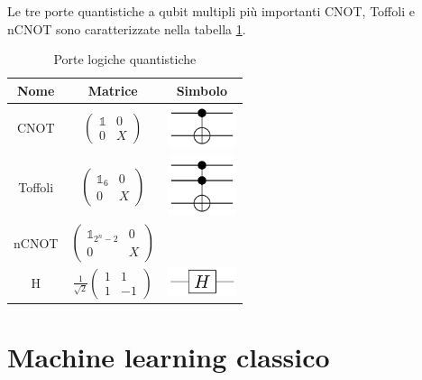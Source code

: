 Le tre porte quantistiche a qubit multipli più importanti CNOT, Toffoli e nCNOT 
sono caratterizzate nella tabella \ref{table:porte}. 

\begin{table}[h!]
    \centering
    \begin{tabular}{c c c}
        Nome & Matrice & Simbolo \\ 
        \hline
        CNOT & $\begin{pmatrix}
            \mathbb{1} & 0 \\ 
            0 & X
        \end{pmatrix}$ & \includegraphics[width=2cm]{gfx/CNOT_gate}\\ 
        Toffoli & $\begin{pmatrix}
            \mathbb{1}_6 & 0 \\
            0 & X
        \end{pmatrix}$ & \includegraphics[width=2cm]{gfx/Toffoli_gate}\\ 
        nCNOT & $\begin{pmatrix}
            \mathbb{1}_{2^n-2} & 0 \\
            0 & X
        \end{pmatrix}$ & \\ 
        H & $\frac{1}{\sqrt{2}}\begin{pmatrix}
            1 & 1 \\
            1 & -1
        \end{pmatrix}$ & \includegraphics[width=2cm]{gfx/150px-Hadamard_gate} \\ 
        \hline
    \end{tabular}
    \caption{Porte logiche quantistiche}
    \label{table:porte}
\end{table}

\section{Machine learning classico}

